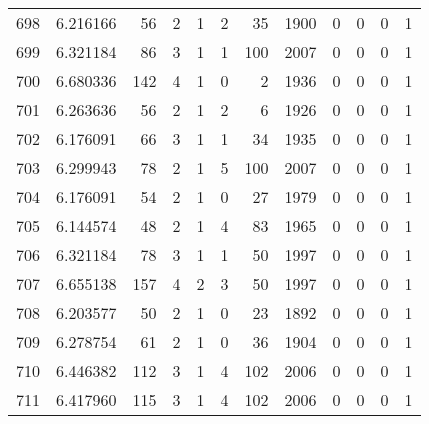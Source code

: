 \begin{tabular}{lrrrrrrrrrrr}
698 &  6.216166 &   56 &      2 &        1 &      2 &              35 &  1900 &               0 &               0 &               0 &               1 \\
699 &  6.321184 &   86 &      3 &        1 &      1 &             100 &  2007 &               0 &               0 &               0 &               1 \\
700 &  6.680336 &  142 &      4 &        1 &      0 &               2 &  1936 &               0 &               0 &               0 &               1 \\
701 &  6.263636 &   56 &      2 &        1 &      2 &               6 &  1926 &               0 &               0 &               0 &               1 \\
702 &  6.176091 &   66 &      3 &        1 &      1 &              34 &  1935 &               0 &               0 &               0 &               1 \\
703 &  6.299943 &   78 &      2 &        1 &      5 &             100 &  2007 &               0 &               0 &               0 &               1 \\
704 &  6.176091 &   54 &      2 &        1 &      0 &              27 &  1979 &               0 &               0 &               0 &               1 \\
705 &  6.144574 &   48 &      2 &        1 &      4 &              83 &  1965 &               0 &               0 &               0 &               1 \\
706 &  6.321184 &   78 &      3 &        1 &      1 &              50 &  1997 &               0 &               0 &               0 &               1 \\
707 &  6.655138 &  157 &      4 &        2 &      3 &              50 &  1997 &               0 &               0 &               0 &               1 \\
708 &  6.203577 &   50 &      2 &        1 &      0 &              23 &  1892 &               0 &               0 &               0 &               1 \\
709 &  6.278754 &   61 &      2 &        1 &      0 &              36 &  1904 &               0 &               0 &               0 &               1 \\
710 &  6.446382 &  112 &      3 &        1 &      4 &             102 &  2006 &               0 &               0 &               0 &               1 \\
711 &  6.417960 &  115 &      3 &        1 &      4 &             102 &  2006 &               0 &               0 &               0 &               1 \\

\end{tabular}
